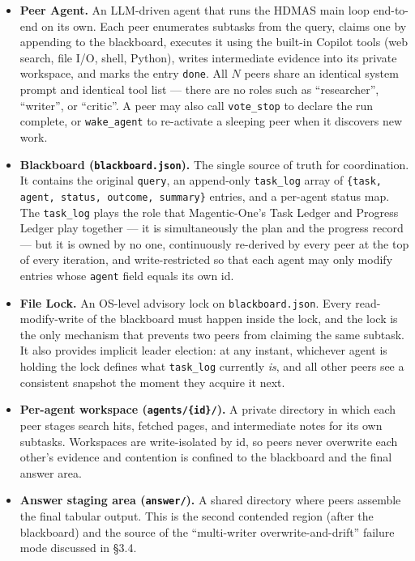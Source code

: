 \documentclass[11pt]{article}
\newcommand{\code}[1]{\texttt{#1}}
\begin{document}
\begin{itemize}[leftmargin=1.2em]
  \item \textbf{Peer Agent.} An LLM-driven agent that runs the HDMAS main loop end-to-end on its own. Each peer enumerates subtasks from the query, claims one by appending to the blackboard, executes it using the built-in Copilot tools (web search, file I/O, shell, Python), writes intermediate evidence into its private workspace, and marks the entry \code{done}. All $N$ peers share an identical system prompt and identical tool list --- there are no roles such as ``researcher'', ``writer'', or ``critic''. A peer may also call \code{vote\_stop} to declare the run complete, or \code{wake\_agent} to re-activate a sleeping peer when it discovers new work.
  \item \textbf{Blackboard (\code{blackboard.json}).} The single source of truth for coordination. It contains the original \code{query}, an append-only \code{task\_log} array of \code{\{task, agent, status, outcome, summary\}} entries, and a per-agent status map. The \code{task\_log} plays the role that Magentic-One's Task Ledger and Progress Ledger play together --- it is simultaneously the plan and the progress record --- but it is owned by no one, continuously re-derived by every peer at the top of every iteration, and write-restricted so that each agent may only modify entries whose \code{agent} field equals its own id.
  \item \textbf{File Lock.} An OS-level advisory lock on \code{blackboard.json}. Every read-modify-write of the blackboard must happen inside the lock, and the lock is the only mechanism that prevents two peers from claiming the same subtask. It also provides implicit leader election: at any instant, whichever agent is holding the lock defines what \code{task\_log} currently \emph{is}, and all other peers see a consistent snapshot the moment they acquire it next.
  \item \textbf{Per-agent workspace (\code{agents/\{id\}/}).} A private directory in which each peer stages search hits, fetched pages, and intermediate notes for its own subtasks. Workspaces are write-isolated by id, so peers never overwrite each other's evidence and contention is confined to the blackboard and the final answer area.
  \item \textbf{Answer staging area (\code{answer/}).} A shared directory where peers assemble the final tabular output. This is the second contended region (after the blackboard) and the source of the ``multi-writer overwrite-and-drift'' failure mode discussed in \S3.4.
\end{itemize}
\end{document}
